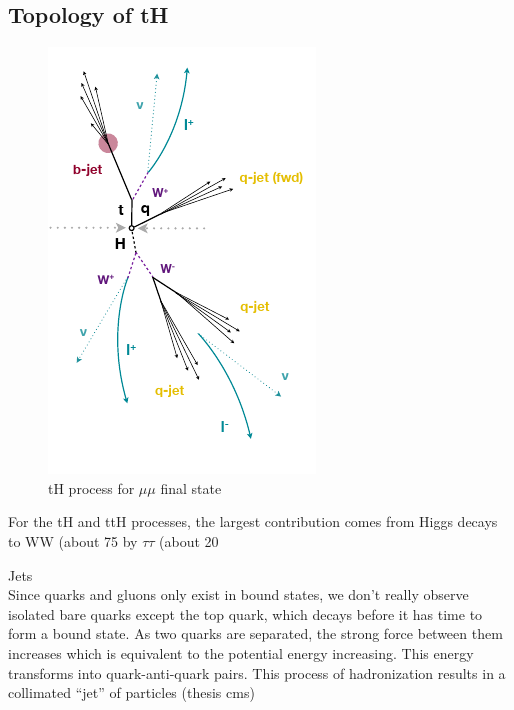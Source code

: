 \begin{linenumbers}
\section{Topology of tH}
\begin{center}
\begin{figure}[!htbp]
\centering
\includegraphics[scale=1.1]{Chapter1/jet.png}\caption{ tH process for $\mu \mu$ final state} \label{jet}
\end{figure}
\end{center}

 For the tH and
ttH processes, the largest contribution comes from Higgs decays to WW (about 75%
by $\tau \tau$ (about 20%

Jets \\
Since quarks and gluons only exist in bound states, we don’t really observe
isolated bare quarks except the top quark, which decays before it has time to form a
bound state. As two quarks are separated, the strong force between them increases
which is equivalent to the potential energy increasing. This energy transforms into
quark-anti-quark pairs. This process of hadronization results in a collimated “jet”
of particles (thesis cms)



\end{linenumbers}
